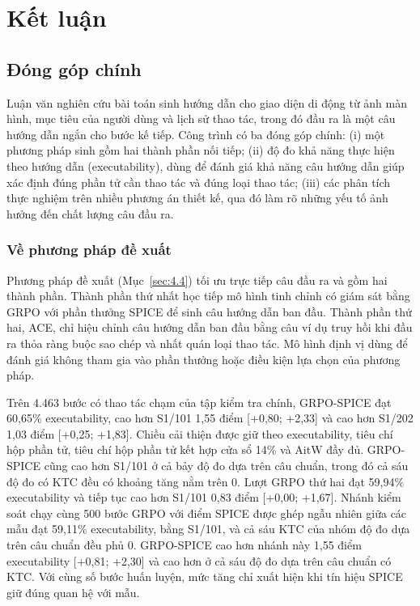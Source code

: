 \chapter{Kết luận}
\label{chap:7}

\section{Đóng góp chính}\label{sec:7.1}

Luận văn nghiên cứu bài toán sinh hướng dẫn cho giao diện di động từ ảnh màn hình, mục tiêu của người dùng và lịch sử thao tác, trong đó đầu ra là một câu hướng dẫn ngắn cho bước kế tiếp. Công trình có ba đóng góp chính: (i) một phương pháp sinh gồm hai thành phần nối tiếp; (ii) độ đo khả năng thực hiện theo hướng dẫn (executability), dùng để đánh giá khả năng câu hướng dẫn giúp xác định đúng phần tử cần thao tác và đúng loại thao tác; (iii) các phân tích thực nghiệm trên nhiều phương án thiết kế, qua đó làm rõ những yếu tố ảnh hưởng đến chất lượng câu đầu ra.

\subsection*{Về phương pháp đề xuất}

Phương pháp đề xuất (Mục~\ref{sec:4.4}) tối ưu trực tiếp câu đầu ra và gồm hai thành phần. Thành phần thứ nhất học tiếp mô hình tinh chỉnh có giám sát bằng GRPO với phần thưởng SPICE để sinh câu hướng dẫn ban đầu. Thành phần thứ hai, ACE, chỉ hiệu chỉnh câu hướng dẫn ban đầu bằng câu ví dụ truy hồi khi đầu ra thỏa ràng buộc sao chép và nhất quán loại thao tác. Mô hình định vị dùng để đánh giá không tham gia vào phần thưởng hoặc điều kiện lựa chọn của phương pháp.

Trên 4.463 bước có thao tác chạm của tập kiểm tra chính, GRPO-SPICE đạt 60,65\% executability, cao hơn S1/101 1,55 điểm [+0,80; +2,33] và cao hơn S1/202 1,03 điểm [+0,25; +1,83]. Chiều cải thiện được giữ theo executability, tiêu chí hộp phần tử, tiêu chí hộp phần tử kết hợp cửa sổ 14\% và AitW đầy đủ. GRPO-SPICE cũng cao hơn S1/101 ở cả bảy độ đo dựa trên câu chuẩn, trong đó cả sáu độ đo có KTC đều có khoảng tăng nằm trên 0. Lượt GRPO thứ hai đạt 59,94\% executability và tiếp tục cao hơn S1/101 0,83 điểm [+0,00; +1,67]. Nhánh kiểm soát chạy cùng 500 bước GRPO với điểm SPICE được ghép ngẫu nhiên giữa các mẫu đạt 59,11\% executability, bằng S1/101, và cả sáu KTC của nhóm độ đo dựa trên câu chuẩn đều phủ 0. GRPO-SPICE cao hơn nhánh này 1,55 điểm executability [+0,81; +2,30] và cao hơn ở cả sáu độ đo dựa trên câu chuẩn có KTC. Với cùng số bước huấn luyện, mức tăng chỉ xuất hiện khi tín hiệu SPICE giữ đúng quan hệ với mẫu.

